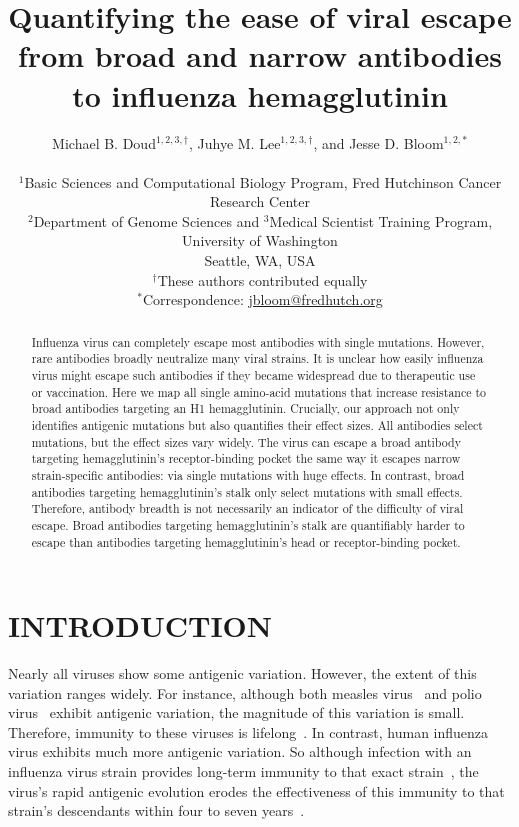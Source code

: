 \documentclass[11pt]{article}
\title{Quantifying the ease of viral escape from broad and narrow antibodies to influenza hemagglutinin}
\author
{Michael B. Doud$^{1,2,3,\dagger}$, Juhye M. Lee$^{1,2,3,\dagger}$, and Jesse D. Bloom$^{1,2,*}$\\
\\
\scriptsize{$^1$Basic Sciences and Computational Biology Program, Fred Hutchinson Cancer Research Center}\\
\scriptsize{$^2$Department of Genome Sciences and $^3$Medical Scientist Training Program, University of Washington} \\
\scriptsize{Seattle, WA, USA} \\
\scriptsize{$^{\dagger}$These authors contributed equally} \\
\scriptsize{$^*$Correspondence: \href{jbloom@fredhutch.org}{jbloom@fredhutch.org}}
}
\date{}
\begin{document}
\maketitle
\onehalfspacing

\begin{abstract}
Influenza virus can completely escape most antibodies with single mutations.
However, rare antibodies broadly neutralize many viral strains.
It is unclear how easily influenza virus might escape such antibodies if they became widespread due to therapeutic use or vaccination.
Here we map all single amino-acid mutations that increase resistance to broad antibodies targeting an H1 hemagglutinin.
Crucially, our approach not only identifies antigenic mutations but also quantifies their effect sizes.
All antibodies select mutations, but the effect sizes vary widely. 
The virus can escape a broad antibody targeting hemagglutinin's receptor-binding pocket the same way it escapes narrow strain-specific antibodies: via single mutations with huge effects.   
In contrast, broad antibodies targeting hemagglutinin's stalk only select mutations with small effects. 
Therefore, antibody breadth is not necessarily an indicator of the difficulty of viral escape.
Broad antibodies targeting hemagglutinin's stalk are quantifiably harder to escape than antibodies targeting hemagglutinin's head or receptor-binding pocket.
\end{abstract}

\section*{INTRODUCTION}
Nearly all viruses show some antigenic variation.
However, the extent of this variation ranges widely.
For instance, although both measles virus~\citep{birrer1981antigenic,ter1981antigenic} and polio virus~\citep{crainic1983natural,diamond1985antigenic,drexler2014robustness} exhibit antigenic variation, the magnitude of this variation is small. 
Therefore, immunity to these viruses is lifelong~\citep{panum1847iagttagelser,salk1984one}.
In contrast, human influenza virus exhibits much more antigenic variation.
So although infection with an influenza virus strain provides long-term immunity to that exact strain~\citep{davies1982christ,yu2008neutralizing}, the virus's rapid antigenic evolution erodes the effectiveness of this immunity to that strain's descendants within four to seven years~\citep{couch1983immunity}.
\end{document}
